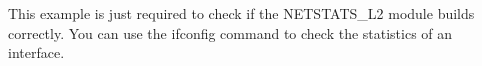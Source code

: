 This example is just required to check if the N\+E\+T\+S\+T\+A\+T\+S\+\_\+\+L2 module builds correctly. You can use the {\ttfamily ifconfig} command to check the statistics of an interface. 